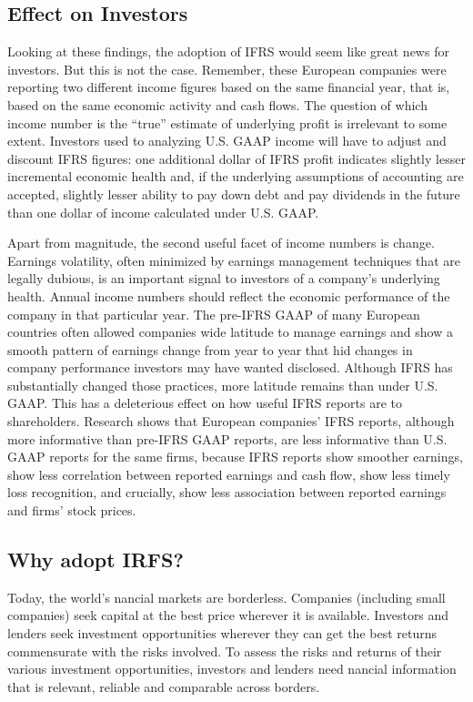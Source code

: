 \subsection{Effect on Investors}
Looking at these findings, the adoption of IFRS would seem like great news for investors. But this is not the case. Remember, these European companies were reporting two different income figures based on the same financial year, that is, based on the same economic activity and cash flows. The question of which income number is the “true” estimate of underlying profit is irrelevant to some extent. Investors used to analyzing U.S. GAAP income will have to adjust and discount IFRS figures: one additional dollar of IFRS profit indicates slightly lesser incremental economic health and, if the underlying assumptions of accounting are accepted, slightly lesser ability to pay down debt and pay dividends in the future than one dollar of income calculated under U.S. GAAP.

Apart from magnitude, the second useful facet of income numbers is change. Earnings volatility, often minimized by earnings management techniques that are legally dubious, is an important signal to investors of a company’s underlying health. Annual income numbers should reflect the economic performance of the company in that particular year. The pre-IFRS GAAP of many European countries often allowed companies wide latitude to manage earnings and show a smooth pattern of earnings change from year to year that hid changes in company performance investors may have wanted disclosed. Although IFRS has substantially changed those practices, more latitude remains than under U.S. GAAP. This has a deleterious effect on how useful IFRS reports are to shareholders. Research shows that European companies’ IFRS reports, although more informative than pre-IFRS GAAP reports, are less informative than U.S. GAAP reports for the same firms, because IFRS reports show smoother earnings, show less correlation between reported earnings and cash flow, show less timely loss recognition, and crucially, show less association between reported earnings and firms’ stock prices.


\subsection{Why adopt IRFS?}
Today, the world’s  nancial markets are borderless. Companies (including small companies) seek capital at the best price wherever it is available. Investors and lenders seek investment opportunities wherever they can get the best returns commensurate with the risks involved. To assess the risks and returns of their various investment opportunities, investors and lenders need  nancial information that is relevant, reliable and comparable across borders. \\

